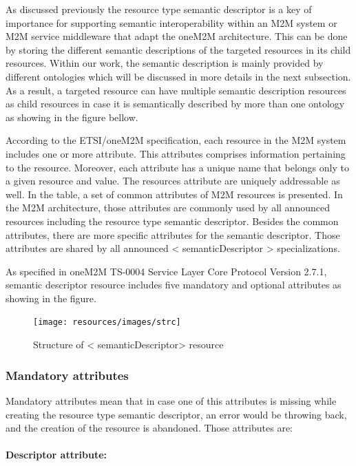As discussed previously the resource type semantic descriptor is a key of importance for supporting semantic interoperability within an M2M system or M2M service middleware that adapt the oneM2M architecture. This can be done by storing the different semantic descriptions of the targeted resources in its child resources. Within our work, the semantic description is mainly provided by different ontologies which will be discussed in more details in the next subsection. As a result, a targeted resource can have multiple semantic description resources as child resources in case it is semantically described by more than one ontology as showing in the figure bellow.  \par
According to the ETSI/oneM2M specification, each resource in the M2M system includes one or more attribute. This attributes comprises information pertaining to the resource. Moreover, each attribute has a unique name that belongs only to a given resource and value. The resources attribute are uniquely addressable as well. In the table, a set of common attributes of M2M resources is presented.
In the M2M architecture, those attributes are commonly used by all announced resources including the resource type semantic descriptor. Besides the common attributes, there are more specific attributes for the semantic descriptor. Those attributes are shared by all announced < semanticDescriptor > specializations.\par
As specified in oneM2M TS-0004 Service Layer Core Protocol Version 2.7.1, semantic descriptor resource includes five mandatory and optional attributes as showing in the figure.
\begin{figure}[htbp]
    \centering
    \texttt{[image: resources/images/strc]}
    \caption{Structure of < semanticDescriptor> resource }\label{fig:contrib1:goal}
\end{figure}
\subsubsection{Mandatory attributes}
Mandatory attributes mean that in case one of this attributes is missing while creating the resource type semantic descriptor, an error would be throwing back, and the creation of the resource is abandoned.
Those attributes are: 

\paragraph*{Descriptor attribute:}

